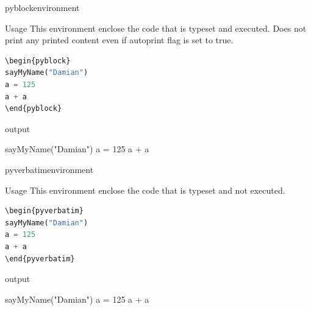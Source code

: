 \documentclass[
aspectratio=1610,
hyperref={pdfpagemode=FullScreen},
english,
usenames,
dvipsnames
]
{beamer} %
\begin{document}
    \begin{frame}[fragile]{pyblock}{environment}
  
  \begin{block}{Usage}
  	This environment enclose the code that is typeset and executed.
  	Does not print any printed content even if autoprint flag is set to true.
  \end{block}
  
 \begin{lstlisting}[language=python]
\begin{pyblock}
sayMyName("Damian")
a = 125
a + a
\end{pyblock}
  \end{lstlisting}
  
  	\begin{exampleblock}{output}
\begin{pyblock}
sayMyName("Damian")
a = 125
a + a
\end{pyblock}
    \onslide
	\end{exampleblock}
  
  \end{frame}  
  
      \begin{frame}[fragile]{pyverbatim}{environment}
  
  \begin{block}{Usage}
  	This environment enclose the code that is typeset and not executed.
  \end{block}
  
 \begin{lstlisting}[language=python]
\begin{pyverbatim}
sayMyName("Damian")
a = 125
a + a
\end{pyverbatim}
  \end{lstlisting}
  
  	\begin{exampleblock}{output}
\begin{pyverbatim}
sayMyName("Damian")
a = 125
a + a
\end{pyverbatim}
    \onslide
	\end{exampleblock}
  
  \end{frame} 
  
\end{document}
